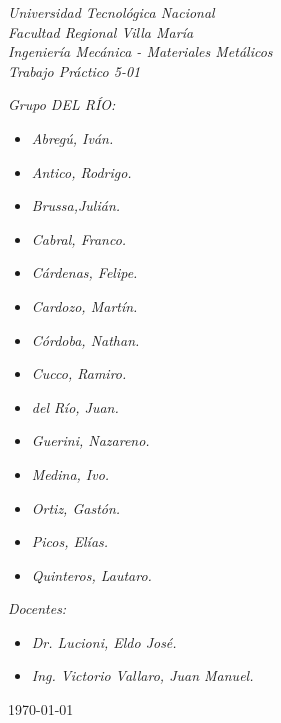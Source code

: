 \begin{titlepage}
	
	\begin{center}
		{\huge \textit{Universidad Tecnológica Nacional}}\\
        \vspace{0.5cm}
		{\LARGE \textit{Facultad Regional Villa María}}\\
		\vspace{1.5cm}
        {\LARGE{\textit{Ingeniería Mecánica - Materiales Metálicos}}}\\
		\vspace{1.5cm}
        \LARGE{\textit{Trabajo Práctico 5-01}}
	\end{center}
	
	\vfill

    \textit{Grupo DEL RÍO:}
	\begin{itemize}
		\item \textit{Abregú, Iván.}
		\item \textit{Antico, Rodrigo.}
		\item \textit{Brussa,Julián.}
		\item \textit{Cabral, Franco.}
        \item \textit{Cárdenas, Felipe.}
        \item \textit{Cardozo, Martín.}
        \item \textit{Córdoba, Nathan.}
        \item \textit{Cucco, Ramiro.}
        \item \textit{del Río, Juan.}
        \item \textit{Guerini, Nazareno.}
        \item \textit{Medina, Ivo.}
        \item \textit{Ortiz, Gastón.}
        \item \textit{Picos, Elías.}
        \item \textit{Quinteros, Lautaro.}
	\end{itemize}
    
	\textit{Docentes:}
	\begin{itemize}
		\item \textit{Dr. Lucioni, Eldo José.}
		\item \textit{Ing. Victorio Vallaro, Juan Manuel.}
	\end{itemize}
	\centering
	\today
	
\end{titlepage}
